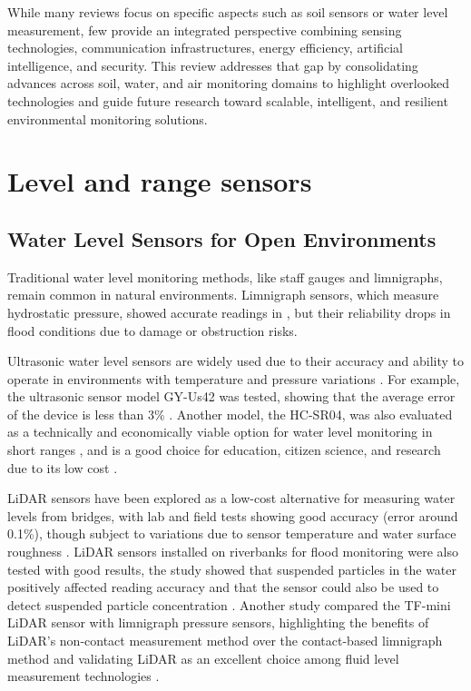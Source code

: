 \documentclass[conference]{IEEEtran}
\begin{document}

While many reviews focus on specific aspects such as soil sensors or water level measurement, few provide an integrated perspective combining sensing technologies, communication infrastructures, energy efficiency, artificial intelligence, and security. This review addresses that gap by consolidating advances across soil, water, and air monitoring domains to highlight overlooked technologies and guide future research toward scalable, intelligent, and resilient environmental monitoring solutions.

\section{Level and range sensors} \label{cap:sensors}

\subsection{Water Level Sensors for Open Environments} \label{subsec:water_level_sensors}

Traditional water level monitoring methods, like staff gauges and limnigraphs, remain common in natural environments. Limnigraph sensors, which measure hydrostatic pressure, showed accurate readings in \cite{santana_2024_development}, but their reliability drops in flood conditions due to damage or obstruction risks. 

Ultrasonic water level sensors are widely used due to their accuracy and ability to operate in environments with temperature and pressure variations \cite{mohammadrezamasoudimoghaddam_2024_a, pereira_2022_evaluation}. For example, the ultrasonic sensor model GY-Us42 was tested, showing that the average error of the device is less than 3\% \cite{mohammadrezamasoudimoghaddam_2024_a}. Another model, the HC-SR04, was also evaluated as a technically and economically viable option for water level monitoring in short ranges \cite{pereira_2022_evaluation}, and is a good choice for education, citizen science, and research due to its low cost \cite{bresnahan_2023_a}.

LiDAR sensors have been explored as a low-cost alternative for measuring water levels from bridges, with lab and field tests showing good accuracy (error around 0.1\%), though subject to variations due to sensor temperature and water surface roughness \cite{paul_2020_a}. LiDAR sensors installed on riverbanks for flood monitoring were also tested with good results, the study showed that suspended particles in the water positively affected reading accuracy and that the sensor could also be used to detect suspended particle concentration \cite{tamari_2016_flash}. Another study compared the TF-mini LiDAR sensor with limnigraph pressure sensors, highlighting the benefits of LiDAR’s non-contact measurement method over the contact-based limnigraph method and validating LiDAR as an excellent choice among fluid level measurement technologies \cite{santana_2024_development}.
\end{document}

